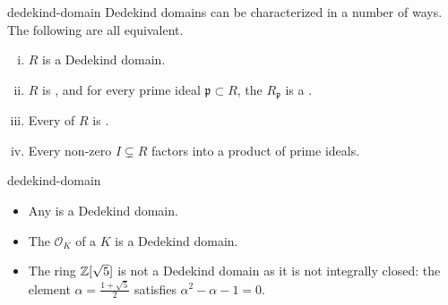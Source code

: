 \begin{example}{dedekind-domain}
    Dedekind domains can be characterized in a number of ways. The following are all equivalent.
    \begin{enumerate}[(i)]
        \item $R$ is a Dedekind domain.
        \item $R$ is , and for every prime ideal $\mathfrak{p} \subset R$, the  $R_\mathfrak{p}$ is a .
        \item Every  of $R$ is .
        \item Every non-zero  $I \subsetneq R$ factors into a product of prime ideals.
    \end{enumerate}
\end{example}

\begin{example}{dedekind-domain}
    \begin{itemize}
        \item Any  is a Dedekind domain.
        \item The  $\mathcal{O}_K$ of a  $K$ is a Dedekind domain.
        \item The ring $\mathbb{Z}[\sqrt{5}]$ is not a Dedekind domain as it is not integrally closed: the element $\alpha = \frac{1 + \sqrt{5}}{2}$ satisfies $\alpha^2 - \alpha - 1 = 0$.
    \end{itemize}
\end{example}

